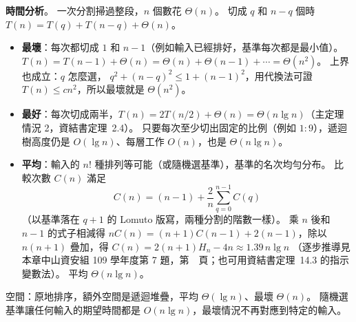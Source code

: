 \begin{pastsoln}
\textbf{時間分析}。 一次分割掃過整段，$n$ 個數花 $\Theta(n)$。 切成 $q$ 和 $n - q$ 個時
$T(n) = T(q) + T(n - q) + \Theta(n)$。
\begin{itemize}
\item \textbf{最壞}：每次都切成 $1$ 和 $n - 1$（例如輸入已經排好，基準每次都是最小值）。
$T(n) = T(n-1) + \Theta(n) = \Theta(n) + \Theta(n-1) + \cdots = \Theta(n^2)$。 上界也成立：$q$ 怎麼選，
$q^2 + (n-q)^2 \le 1 + (n-1)^2$，用代換法可證 $T(n) \le cn^2$，所以最壞就是 $\Theta(n^2)$。
\item \textbf{最好}：每次切成兩半，$T(n) = 2T(n/2) + \Theta(n) = \Theta(n \lg n)$（主定理情況 2，資結書定理~2.4）。
只要每次至少切出固定的比例（例如 $1:9$），遞迴樹高度仍是 $O(\lg n)$、每層工作 $O(n)$，也是 $\Theta(n \lg n)$。
\item \textbf{平均}：輸入的 $n!$ 種排列等可能（或隨機選基準），基準的名次均勻分布。 比較次數 $C(n)$ 滿足
\[
C(n) = (n - 1) + \frac{2}{n}\sum_{q=0}^{n-1} C(q)
\]
（以基準落在 $q + 1$ 的 Lomuto 版寫，兩種分割的階數一樣）。 乘 $n$ 後和 $n - 1$ 的式子相減得
$nC(n) = (n+1)C(n-1) + 2(n-1)$，除以 $n(n+1)$ 疊加，得 $C(n) = 2(n+1)H_n - 4n \approx 1.39\, n \lg n$
（逐步推導見本章中山資安組 109 學年度第 7 題，第~\pageref{px:nsysu-109-dmalg-04}~頁；也可用資結書定理~14.3 的指示
變數法）。 平均 $\Theta(n \lg n)$。
\end{itemize}
空間：原地排序，額外空間是遞迴堆疊，平均 $\Theta(\lg n)$、最壞 $\Theta(n)$。 隨機選基準讓任何輸入的期望時間都是
$O(n \lg n)$，最壞情況不再對應到特定的輸入。
\end{pastsoln}
